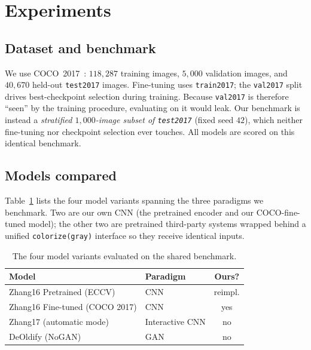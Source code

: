 \section{Experiments}
\label{sec:experiments}

\subsection{Dataset and benchmark}
We use COCO~2017~\cite{lin2014coco}: $118{,}287$ training images, $5{,}000$
validation images, and $40{,}670$ held-out \texttt{test2017} images. Fine-tuning
uses \texttt{train2017}; the \texttt{val2017} split drives best-checkpoint
selection during training. Because \texttt{val2017} is therefore ``seen'' by the
training procedure, evaluating on it would leak. Our benchmark is instead a
\emph{stratified $1{,}000$-image subset of \texttt{test2017}} (fixed seed
$42$), which neither fine-tuning nor checkpoint selection ever touches. All
models are scored on this identical benchmark.

\subsection{Models compared}
Table~\ref{tab:models} lists the four model variants spanning the three
paradigms we benchmark. Two are our own CNN (the pretrained encoder and our
COCO-fine-tuned model); the other two are pretrained third-party systems
wrapped behind a unified \texttt{colorize(gray)} interface so they receive
identical inputs.

\begin{table}[t]
\centering
\caption{The four model variants evaluated on the shared benchmark.}
\label{tab:models}
\begin{tabular}{@{}llc@{}}
\toprule
Model & Paradigm & Ours? \\
\midrule
Zhang16 Pretrained (ECCV)      & CNN             & reimpl. \\
Zhang16 Fine-tuned (COCO 2017) & CNN             & yes \\
Zhang17 (automatic mode)       & Interactive CNN & no \\
DeOldify (NoGAN)               & GAN             & no \\
\bottomrule
\end{tabular}
\end{table}

